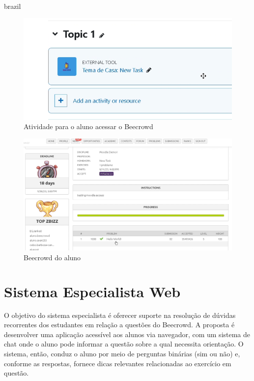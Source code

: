 \begin{otherlanguage*}{brazil}
\begin{figure}[H]
    \centering
            \caption{Atividade para o aluno acessar o Beecrowd}
            \label{fig:ModeloConceitual}
        \includegraphics[scale=0.4]{pictures/desenvolvimento/lti_tarefa.png}
\end{figure}

\begin{figure}[H]
    \centering
            \caption{Beecrowd do aluno}
            \label{fig:ModeloConceitual}
        \includegraphics[scale=0.4]{pictures/desenvolvimento/lti_beecrowd_aluno.png}
\end{figure}

\section{Sistema Especialista Web}

O objetivo do sistema especialista é oferecer suporte na resolução de dúvidas recorrentes dos estudantes em relação a questões do Beecrowd. A proposta é desenvolver uma aplicação acessível aos alunos via navegador, com um sistema de chat onde o aluno pode informar a questão sobre a qual necessita orientação. O sistema, então, conduz o aluno por meio de perguntas binárias (sim ou não) e, conforme as respostas, fornece dicas relevantes relacionadas ao exercício em questão.


\end{otherlanguage*}
